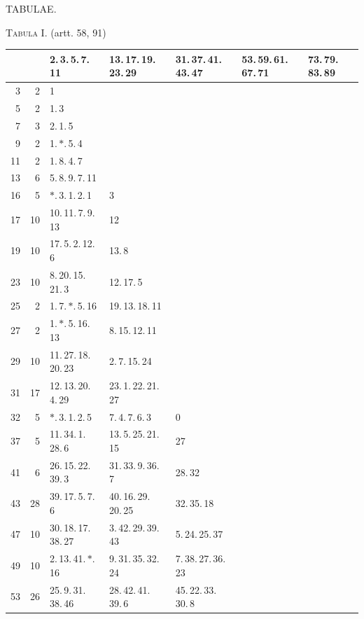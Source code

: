 \begin{landscape}\thispagestyle{empty}

\centerline{\large TABULAE.}\smallskip

\centerline{\textsc{Tabula I.} (artt. 58, 91)}\smallskip
\begingroup\centering\fontsize{10}{11}\selectfont\renewcommand{\arraystretch}{0.87}\setlength{\tabcolsep}{4pt}
\begin{tabular}{r||r|lllll}\hline
 & & 2.\,3.\,5.\,7.\,11 & 13.\,17.\,19.\,23.\,29 & 31.\,37.\,41.\,43.\,47 & 53.\,59.\,61.\,67.\,71 & 73.\,79.\,83.\,89\\\hline
3 & 2 & 1 &  &  &  & \\
5 & 2 & 1.\,3 &  &  &  & \\
7 & 3 & 2.\,1.\,5 &  &  &  & \\
9 & 2 & 1.\,\(\ast\).\,5.\,4 &  &  &  & \\
11 & 2 & 1.\,8.\,4.\,7 &  &  &  & \\
13 & 6 & 5.\,8.\,9.\,7.\,11 &  &  &  & \\
16 & 5 & \(\ast\).\,3.\,1.\,2.\,1 & 3 &  &  & \\
17 & 10 & 10.\,11.\,7.\,9.\,13 & 12 &  &  & \\
19 & 10 & 17.\,5.\,2.\,12.\,6 & 13.\,8 &  &  & \\
23 & 10 & 8.\,20.\,15.\,21.\,3 & 12.\,17.\,5 &  &  & \\
25 & 2 & 1.\,7.\,\(\ast\).\,5.\,16 & 19.\,13.\,18.\,11 &  &  & \\
27 & 2 & 1.\,\(\ast\).\,5.\,16.\,13 & 8.\,15.\,12.\,11 &  &  & \\
29 & 10 & 11.\,27.\,18.\,20.\,23 & 2.\,7.\,15.\,24 &  &  & \\
31 & 17 & 12.\,13.\,20.\,4.\,29 & 23.\,1.\,22.\,21.\,27 &  &  & \\
32 & 5 & \(\ast\).\,3.\,1.\,2.\,5 & 7.\,4.\,7.\,6.\,3 & 0 &  & \\
37 & 5 & 11.\,34.\,1.\,28.\,6 & 13.\,5.\,25.\,21.\,15 & 27 &  & \\
41 & 6 & 26.\,15.\,22.\,39.\,3 & 31.\,33.\,9.\,36.\,7 & 28.\,32 &  & \\
43 & 28 & 39.\,17.\,5.\,7.\,6 & 40.\,16.\,29.\,20.\,25 & 32.\,35.\,18 &  & \\
47 & 10 & 30.\,18.\,17.\,38.\,27 & 3.\,42.\,29.\,39.\,43 & 5.\,24.\,25.\,37 &  & \\
49 & 10 & 2.\,13.\,41.\,\(\ast\).\,16 & 9.\,31.\,35.\,32.\,24 & 7.\,38.\,27.\,36.\,23 &  & \\
53 & 26 & 25.\,9.\,31.\,38.\,46 & 28.\,42.\,41.\,39.\,6 & 45.\,22.\,33.\,30.\,8 &  & \\

\end{tabular}
\end{landscape}
